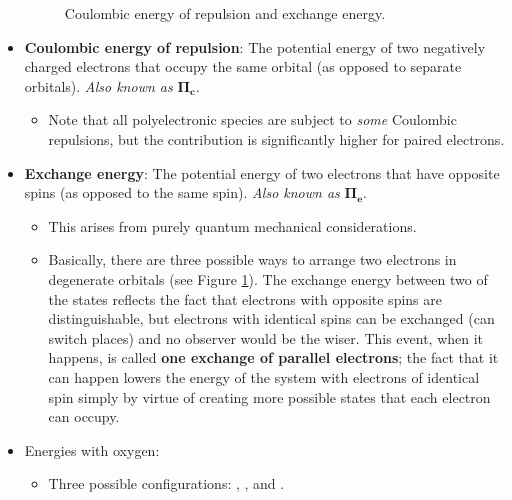 \documentclass[../notes.tex]{subfiles}
\begin{document}
\begin{itemize}
\begin{figure}[H]
        \caption{Coulombic energy of repulsion and exchange energy.}
        \label{fig:coulombExchange}
    \end{figure}
    \item \textbf{Coulombic energy of repulsion}: The potential energy of two negatively charged electrons that occupy the same orbital (as opposed to separate orbitals). \emph{Also known as} $\bm{\Pi_c}$.
    \begin{itemize}
        \item Note that all polyelectronic species are subject to \emph{some} Coulombic repulsions, but the contribution is significantly higher for paired electrons.
    \end{itemize}
    \item \textbf{Exchange energy}: The potential energy of two electrons that have opposite spins (as opposed to the same spin). \emph{Also known as} $\bm{\Pi_e}$.
    \begin{itemize}
        \item This arises from purely quantum mechanical considerations.
        \item Basically, there are three possible ways to arrange two electrons in degenerate orbitals (see Figure \ref{fig:coulombExchange}). The exchange energy between two of the states reflects the fact that electrons with opposite spins are distinguishable, but electrons with identical spins can be exchanged (can switch places) and no observer would be the wiser. This event, when it happens, is called \textbf{one exchange of parallel electrons}; the fact that it can happen lowers the energy of the system with electrons of identical spin simply by virtue of creating more possible states that each electron can occupy.
    \end{itemize}
    \item {}Energies with oxygen:
    \begin{itemize}
        \item Three possible configurations: , , and .

\end{itemize}
\end{itemize}
\end{document}
